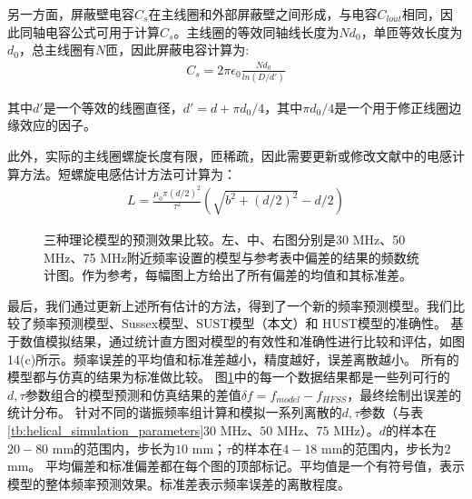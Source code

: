 另一方面，屏蔽壁电容$C_s$在主线圈和外部屏蔽壁之间形成，与电容$C_{lout}$相同，因此同轴电容公式可用于计算$C_s$。主线圈的等效同轴线长度为$Nd_0$，单匝等效长度为$d_0$，总主线圈有$N$匝，因此屏蔽电容计算为:
\begin{align}
    C_s=2\pi\epsilon_0 \frac{Nd_0}{ln(D/d')} \label{eq:helical_C_s_new}
\end{align}

其中$d'$是一个等效的线圈直径，$d'=d+\pi d_0/4$，其中$\pi d_0/4$是一个用于修正线圈边缘效应的因子。

此外，实际的主线圈螺旋长度有限，匝稀疏，因此需要更新或修改文献\cite[]{Siverns_Simkins_Weidt_Hensinger_2012}中的电感计算方法。短螺旋电感估计方法可计算为：
\begin{align}
    L=\frac{\mu_0 \pi (d/2)^2 }{\tau^2} (\sqrt{b^2+(d/2)^2}-d/2) \label{eq:helical_L_new}
\end{align}

\begin{figure}
    \centering
    \caption[三种理论模型的预测效果比较]{三种理论模型的预测效果比较。左、中、右图分别是30 MHz、50 MHz、75 MHz附近频率设置的模型与参考表中偏差的结果的频数统计图。作为参考，每幅图上方给出了所有偏差的均值和其标准差。\label{fig:helical_freqmodelcompare}}

\end{figure}

最后，我们通过更新上述所有估计的方法，得到了一个新的频率预测模型。我们比较了频率预测模型、Sussex模型\cite[]{Siverns_Simkins_Weidt_Hensinger_2012}、SUST模型（本文）和 HUST模型\cite[]{Deng_Sun_Yuan_Xu_Zhang_Lu_Luo_2014}的准确性。
基于数值模拟结果，通过统计直方图对模型的有效性和准确性进行比较和评估，如图14(c)所示。频率误差的平均值和标准差越小，精度越好，误差离散越小。
所有的模型都与仿真的结果为标准做比较。
图\ref{fig:helical_freqmodelcompare}中的每一个数据结果都是一些列可行的$d,\tau$参数组合的模型预测和仿真结果的差值$\delta f=f_{model}-f_{HFSS}$，最终绘制出误差的统计分布。
针对不同的谐振频率组计算和模拟一系列离散的$d,\tau$参数（与表\ref{tb:helical_simulation_parameters}$30$ MHz、$50$ MHz、$75$ MHz）。$d$的样本在$20-80$ mm的范围内，步长为$10$ mm；$\tau$的样本在$4-18$ mm的范围内，步长为$2$ mm。
平均偏差和标准偏差都在每个图的顶部标记。平均值是一个有符号值，表示模型的整体频率预测效果。标准差表示频率误差的离散程度。


